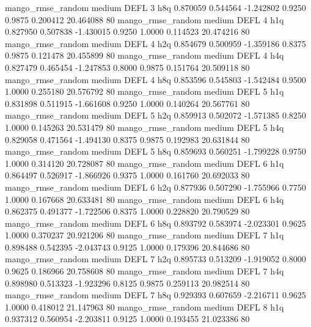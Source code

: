 mango_rmse_random     medium     DEFL                 3                  h8q  0.870059 0.544564 -1.242802 0.9250 0.9875  0.200412   20.464088 80
mango_rmse_random     medium     DEFL                 4                  h1q  0.827950 0.507838 -1.430015 0.9250 1.0000  0.114523   20.474216 80
mango_rmse_random     medium     DEFL                 4                  h2q  0.854679 0.500959 -1.359186 0.8375 0.9875  0.121478   20.455899 80
mango_rmse_random     medium     DEFL                 4                  h4q  0.827479 0.465454 -1.247853 0.8000 0.9875  0.151764   20.509118 80
mango_rmse_random     medium     DEFL                 4                  h8q  0.853596 0.545803 -1.542484 0.9500 1.0000  0.255180   20.576792 80
mango_rmse_random     medium     DEFL                 5                  h1q  0.831898 0.511915 -1.661608 0.9250 1.0000  0.140264   20.567761 80
mango_rmse_random     medium     DEFL                 5                  h2q  0.859913 0.502072 -1.571385 0.8250 1.0000  0.145263   20.531479 80
mango_rmse_random     medium     DEFL                 5                  h4q  0.829058 0.471564 -1.494130 0.8375 0.9875  0.192983   20.631844 80
mango_rmse_random     medium     DEFL                 5                  h8q  0.859693 0.560251 -1.799228 0.9750 1.0000  0.314120   20.728087 80
mango_rmse_random     medium     DEFL                 6                  h1q  0.864497 0.526917 -1.866926 0.9375 1.0000  0.161760   20.692033 80
mango_rmse_random     medium     DEFL                 6                  h2q  0.877936 0.507290 -1.755966 0.7750 1.0000  0.167668   20.633481 80
mango_rmse_random     medium     DEFL                 6                  h4q  0.862375 0.491377 -1.722506 0.8375 1.0000  0.228820   20.790529 80
mango_rmse_random     medium     DEFL                 6                  h8q  0.893792 0.583974 -2.023301 0.9625 1.0000  0.370237   20.921206 80
mango_rmse_random     medium     DEFL                 7                  h1q  0.898488 0.542395 -2.043743 0.9125 1.0000  0.179396   20.844686 80
mango_rmse_random     medium     DEFL                 7                  h2q  0.895733 0.513209 -1.919052 0.8000 0.9625  0.186966   20.758608 80
mango_rmse_random     medium     DEFL                 7                  h4q  0.898980 0.513323 -1.923296 0.8125 0.9875  0.259113   20.982514 80
mango_rmse_random     medium     DEFL                 7                  h8q  0.929393 0.607659 -2.216711 0.9625 1.0000  0.418012   21.147963 80
mango_rmse_random     medium     DEFL                 8                  h1q  0.937312 0.560954 -2.203811 0.9125 1.0000  0.193455   21.023386 80
